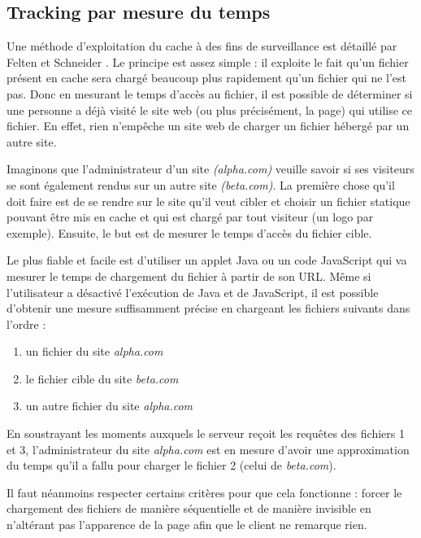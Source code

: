 \subsection{Tracking par mesure du temps}
Une méthode d'exploitation du cache à des fins de surveillance est détaillé par Felten et Schneider \cite{Felten:2000:TAW:352600.352606}.
Le principe est assez simple : il exploite le fait qu'un fichier présent en cache sera chargé beaucoup plus rapidement qu'un fichier qui ne l'est pas. Donc en mesurant le temps d'accès au fichier, il est possible de déterminer si une personne a déjà visité le site web (ou plus précisément, la page) qui utilise ce fichier. En effet, rien n'empêche un site web de charger un fichier hébergé par un autre site.
\newline

Imaginons que l'administrateur d'un site \emph{(alpha.com)} veuille savoir si ses visiteurs se sont également rendus sur un autre site \emph{(beta.com)}. La première chose qu'il doit faire est de se rendre sur le site qu'il veut cibler et choisir un fichier statique pouvant être mis en cache et qui est chargé par tout visiteur (un logo par exemple). Ensuite, le but est de mesurer le temps d'accès du fichier cible.

Le plus fiable et facile est d'utiliser un applet Java ou un code JavaScript qui va mesurer le temps de chargement du fichier à partir de son URL. Même si l'utilisateur a désactivé l'exécution de Java et de JavaScript, il est possible d'obtenir une mesure suffisamment précise en chargeant les fichiers suivants dans l'ordre :

\begin{enumerate}
  \item un fichier du site \emph{alpha.com}
  \item le fichier cible du site \emph{beta.com}
  \item un autre fichier du site \emph{alpha.com}
\end{enumerate}

En soustrayant les moments auxquels le serveur reçoit les requêtes des fichiers 1 et 3, l'administrateur du site \emph{alpha.com} est en mesure d'avoir une approximation du temps qu'il a fallu pour charger le fichier 2 (celui de \emph{beta.com}).

Il faut néanmoins respecter certains critères pour que cela fonctionne : forcer le chargement des fichiers de manière séquentielle et de manière invisible en n'altérant pas l'apparence de la page afin que le client ne remarque rien.
\newline

